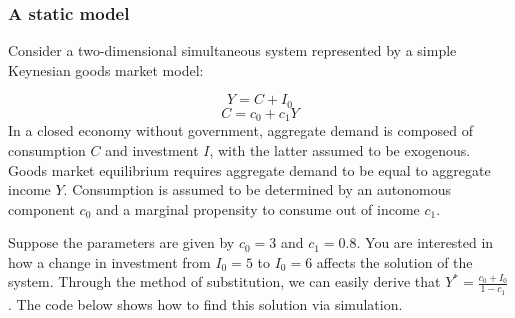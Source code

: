 \documentclass[
  letterpaper,
  DIV=11,
  numbers=noendperiod]{scrreprt}
\begin{document}
\subsubsection{A static model}\label{a-static-model}

Consider a two-dimensional simultaneous system represented by a simple
Keynesian goods market model:

\[
Y= C + I_0
\] \[
C = c_0 + c_1Y
\] In a closed economy without government, aggregate demand is composed
of consumption \(C\) and investment \(I\), with the latter assumed to be
exogenous. Goods market equilibrium requires aggregate demand to be
equal to aggregate income \(Y\). Consumption is assumed to be determined
by an autonomous component \(c_0\) and a marginal propensity to consume
out of income \(c_1\).

Suppose the parameters are given by \(c_0=3\) and \(c_1=0.8\). You are
interested in how a change in investment from \(I_0=5\) to \(I_0=6\)
affects the solution of the system. Through the method of substitution,
we can easily derive that \(Y^*=\frac{c_0+I_0}{1-c_1}\). The code below
shows how to find this solution via simulation.
\end{document}
